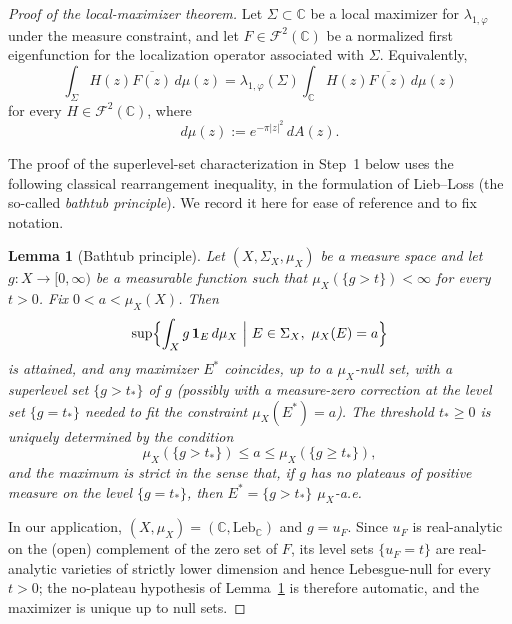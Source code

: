 \documentclass[a4paper,11pt,reqno]{amsart}
\numberwithin{equation}{section}
\theoremstyle{plain} %
\newtheorem{lemma}{Lemma}[section]
\theoremstyle{definition} %
\theoremstyle{remark}
\newcommand{\C}{\mathbb{C}}
\begin{document}
\begin{proof}[Proof of the local-maximizer theorem]
Let \(\Sigma\subset \C\) be a local maximizer for \(\lambda_{1,\varphi}\) under
the measure constraint, and let \(F\in \mathcal F^2(\C)\) be a normalized first
eigenfunction for the localization operator associated with \(\Sigma\).
Equivalently,
\begin{equation}\label{eq:eigenvalue-equation}
\int_\Sigma H(z)\overline{F(z)}\,d\mu(z)
=
\lambda_{1,\varphi}(\Sigma)\int_\C H(z)\overline{F(z)}\,d\mu(z)
\end{equation}
for every \(H\in \mathcal F^2(\C)\), where
\[
d\mu(z):=e^{-\pi |z|^2}\,dA(z).
\]

The proof of the superlevel-set characterization in Step~1 below uses the
following classical rearrangement inequality, in the formulation of
Lieb--Loss
\cite[Theorem~1.14]{Lieb-Loss} (the so-called
\emph{bathtub principle}). We record it here for ease of reference and to fix
notation.

\begin{lemma}[Bathtub principle]\label{lem:bathtub}
Let \((X,\Sigma_X,\mu_X)\) be a measure space and let
\(g\colon X\to[0,\infty)\) be a measurable function such that
\(\mu_X(\{g>t\})<\infty\) for every \(t>0\). Fix \(0<a<\mu_X(X)\). Then
\begin{equation}\label{eq:bathtub-equation}
\sup\Bigl\{\int_X g\,\mathbf 1_E\,d\mu_X\ \Big|\ E\in\Sigma_X,\ \mu_X(E)=a\Bigr\}
\end{equation}
is attained, and any maximizer \(E^\ast\) coincides, up to a \(\mu_X\)-null
set, with a superlevel set \(\{g>t_\ast\}\) of \(g\) (possibly with a
measure-zero correction at the level set \(\{g=t_\ast\}\) needed to fit the
constraint \(\mu_X(E^\ast)=a\)). The threshold \(t_\ast\ge 0\) is uniquely
determined by the condition
\[
\mu_X(\{g>t_\ast\})\le a\le \mu_X(\{g\ge t_\ast\}),
\]
and the maximum is strict in the sense that, if \(g\) has no plateaus of
positive measure on the level \(\{g=t_\ast\}\), then \(E^\ast=\{g>t_\ast\}\)
\(\mu_X\)-a.e.
\end{lemma}

In our application, \((X,\mu_X)=(\C,\mathrm{Leb}_\C)\) and \(g=u_F\). Since
\(u_F\) is real-analytic on the (open) complement of the zero set of \(F\),
its level sets \(\{u_F=t\}\) are real-analytic varieties of strictly lower
dimension and hence Lebesgue-null for every \(t>0\); the no-plateau
hypothesis of Lemma~\ref{lem:bathtub} is therefore automatic, and the
maximizer is unique up to null sets.


\end{proof}
\end{document}
